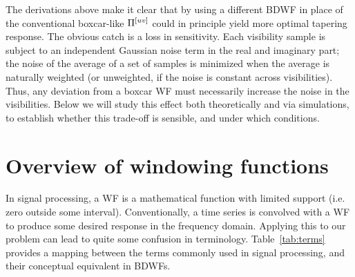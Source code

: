 \documentclass[useAMS,usenatbib]{mn2e}
\begin{document}
The derivations above make it clear that by using a different BDWF in place of the conventional boxcar-like $\Pi^{[uv]}$ 
could in principle yield more optimal tapering response. The obvious catch is a loss in 
sensitivity. Each visibility sample is subject to an independent Gaussian noise term in the real and imaginary part; the noise of
the average of a set of samples is minimized when the average is naturally weighted (or unweighted, if the noise is 
constant across visibilities). Thus, any deviation from a boxcar WF must necessarily increase the noise in the 
visibilities. Below we will study this effect both theoretically and via simulations, to establish whether this 
trade-off is sensible, and under which conditions.

\section{Overview of windowing functions}
\label{subsec:Windowing functions}

In signal processing, a WF is a mathematical function with limited support (i.e. zero outside some interval). Conventionally,
a time series is convolved with a WF to produce some desired response in the frequency domain. Applying this to our problem
can lead to quite some confusion in terminology. Table~\ref{tab:terms} provides a mapping between the terms commonly used in signal processing, 
and their conceptual equivalent in BDWFs.
\end{document}
